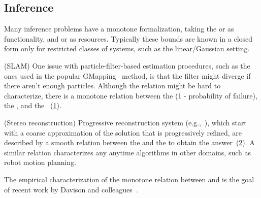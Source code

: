 \subsection{Inference}

Many inference problems have a monotone formalization, taking the
 or  as functionality, and 
or  as resources. Typically these bounds are known in
a closed form only for restricted classes of systems, such as the
linear/Gaussian setting.

\begin{example}
(SLAM)
  One issue with particle-filter-based estimation procedures,
  such as the ones used in the popular GMapping~\cite{grisetti07improved}
  method, is that the filter might diverge if there aren't enough particles.
  Although the relation might be hard to characterize, there is a monotone
  relation between the  (1 - probability of failure),
  the , and the ~(\cref{fig:gmapping}).
\end{example}

\begin{figure}[h]
  \centering
  \caption{\label{fig:gmapping} }
\end{figure}



\begin{example}
(Stereo reconstruction)
  Progressive reconstruction system (e.g.,~\cite{locher16progressive}),
  which start with a coarse approximation of the solution that is progressively
  refined, are described by a smooth relation between the 
  and the  to obtain the answer~(\cref{fig:progressive}).
  A similar relation characterizes any anytime algorithms in other domains,
  such as robot motion planning.
\end{example}


\begin{figure}[h]
  \centering
  \caption{\label{fig:progressive}}
\end{figure}


\begin{example}
  The empirical characterization of the monotone relation between  and 
  is the goal of recent work by Davison and colleagues~\cite{nardi15introducing,zia16comparative}.
\end{example}

